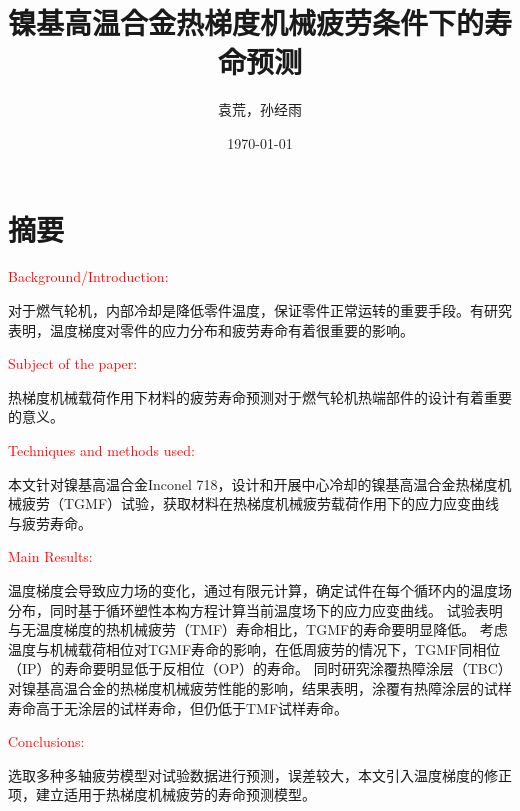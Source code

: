\documentclass{article}
\newcommand{\marked}[1]{\textcolor{red}{#1}}
\begin{document}
\title{镍基高温合金热梯度机械疲劳条件下的寿命预测}

\author{袁荒，孙经雨}
\date{\today}
\maketitle

\section*{摘要}

\marked{Background/Introduction:}

对于燃气轮机，内部冷却是降低零件温度，保证零件正常运转的重要手段。有研究表明，温度梯度对零件的应力分布和疲劳寿命有着很重要的影响。

\marked{Subject of the paper:}

热梯度机械载荷作用下材料的疲劳寿命预测对于燃气轮机热端部件的设计有着重要的意义。

\marked{Techniques and methods used:}

本文针对镍基高温合金Inconel 718，设计和开展中心冷却的镍基高温合金热梯度机械疲劳（TGMF）试验，获取材料在热梯度机械疲劳载荷作用下的应力应变曲线与疲劳寿命。

\marked{Main Results:}

温度梯度会导致应力场的变化，通过有限元计算，确定试件在每个循环内的温度场分布，同时基于循环塑性本构方程计算当前温度场下的应力应变曲线。
试验表明与无温度梯度的热机械疲劳（TMF）寿命相比，TGMF的寿命要明显降低。
考虑温度与机械载荷相位对TGMF寿命的影响，在低周疲劳的情况下，TGMF同相位（IP）的寿命要明显低于反相位（OP）的寿命。
同时研究涂覆热障涂层（TBC）对镍基高温合金的热梯度机械疲劳性能的影响，结果表明，涂覆有热障涂层的试样寿命高于无涂层的试样寿命，但仍低于TMF试样寿命。

\marked{Conclusions:}

选取多种多轴疲劳模型对试验数据进行预测，误差较大，本文引入温度梯度的修正项，建立适用于热梯度机械疲劳的寿命预测模型。
\end{document}
